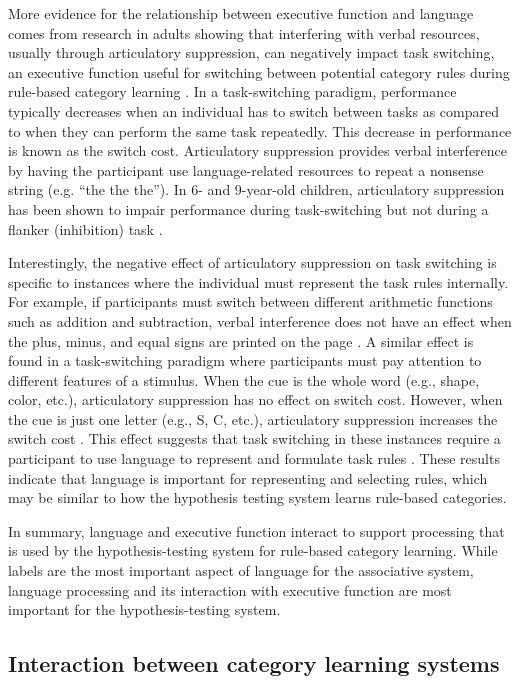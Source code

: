 \documentclass[../dissertation.tex]{subfiles}
\begin{document}
	More evidence for the relationship between executive function and language comes from research in adults showing that interfering with verbal resources, usually through articulatory suppression, can negatively impact task switching, an executive function useful for switching between potential category rules during rule-based category learning \citep{Baddeley2001,Emerson2003}. In a task-switching paradigm, performance typically decreases when an individual has to switch between tasks as compared to when they can perform the same task repeatedly. This decrease in performance is known as the switch cost. Articulatory suppression provides verbal interference by having the participant use language-related resources to repeat a nonsense string (e.g. “the the the”). In 6- and 9-year-old children, articulatory suppression has been shown to impair performance during task-switching but not during a flanker (inhibition) task \citep{Fatzer2012}. \par
	Interestingly, the negative effect of articulatory suppression on task switching is specific to instances where the individual must represent the task rules internally. For example, if participants must switch between different arithmetic functions such as addition and subtraction, verbal interference does not have an effect when the plus, minus, and equal signs are printed on the page \citep{Baddeley2001}. A similar effect is found in a task-switching paradigm where participants must pay attention to different features of a stimulus. When the cue is the whole word (e.g., shape, color, etc.), articulatory suppression has no effect on switch cost. However, when the cue is just one letter (e.g., S, C, etc.), articulatory suppression increases the switch cost \citep{Miyake2004}. This effect suggests that task switching in these instances require a participant to use language to represent and formulate task rules \citep{Cragg2010}. These results indicate that language is important for representing and selecting rules, which may be similar to how the hypothesis testing system learns rule-based categories. \par
	 In summary, language and executive function interact to support processing that is used by the hypothesis-testing system for rule-based category learning. While labels are the most important aspect of language for the associative system, language processing and its interaction with executive function are most important for the hypothesis-testing system.
	
\subsection{Interaction between category learning systems}\label{order_intro}
\end{document}
